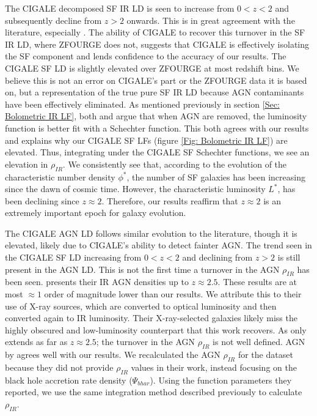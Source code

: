 The CIGALE decomposed SF IR LD is seen to increase from $0<z<2$ and subsequently decline from $z>2$ onwards. This is in great agreement with the literature, especially \cite{madau_cosmic_2014}. The ability of CIGALE to recover this turnover in the SF IR LD, where ZFOURGE does not, suggests that CIGALE is effectively isolating the SF component and lends confidence to the accuracy of our results. The CIGALE SF LD is slightly elevated over ZFOURGE at most redshift bins. We believe this is not an error on CIGALE's part or the ZFOURGE data it is based on, but a representation of the true pure SF IR LD because AGN contaminants have been effectively eliminated. As mentioned previously in section \ref{Sec: Bolometric IR LF}, both \cite{fu_decomposing_2010} and \cite{wu_mid-infrared_2011} argue that when AGN are removed, the luminosity function is better fit with a Schechter function. This both agrees with our results and explains why our CIGALE SF LFs (figure \ref{Fig: Bolometric IR LF}) are elevated. Thus, integrating under the CIGALE SF Schechter functions, we see an elevation in $\rho_{IR}$. We consistently see that, according to the evolution of the characteristic number density $\phi^{*}$, the number of SF galaxies has been increasing since the dawn of cosmic time. However, the characteristic luminosity $L^{*}$, has been declining since $z\approx2$. Therefore, our results reaffirm that $z\approx2$ is an extremely important epoch for galaxy evolution.

The CIGALE AGN LD follows similar evolution to the literature, though it is elevated, likely due to CIGALE's ability to detect fainter AGN. The trend seen in the CIGALE SF LD increasing from $0<z<2$ and declining from $z>2$ is still present in the AGN LD. This is not the first time a turnover in the AGN $\rho_{IR}$ has been seen. \cite{symeonidis_agn_2021} presents their IR AGN densities up to $z\approx2.5$. These results are at most $\approx 1$ order of magnitude lower than our results. We attribute this to their use of \cite{aird_evolution_2015} X-ray sources, which are converted to optical luminosity and then converted again to IR luminosity. Their X-ray-selected galaxies likely miss the highly obscured and low-luminosity counterpart that this work recovers. As \cite{symeonidis_agn_2021} only extends as far as $z\approx2.5$; the turnover in the AGN $\rho_{IR}$ is not well defined. AGN by \cite{delvecchio_tracing_2014} agrees well with our results. We recalculated the AGN $\rho_{IR}$ for the \cite{delvecchio_tracing_2014} dataset because they did not provide $\rho_{IR}$ values in their work, instead focusing on the black hole accretion rate density ($\Psi_{bhar}$). Using the function parameters they reported, we use the same integration method described previously to calculate $\rho_{IR}$.

